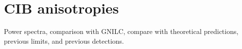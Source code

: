 \documentclass{aa}
\newcommand{\m}[0]{\vec{m}}
\begin{document}










\clearpage
\section{CIB anisotropies}
\label{sec:fluct}

Power spectra, comparison with GNILC, compare with theoretical predictions, previous limits, and previous detections.
\end{document}
